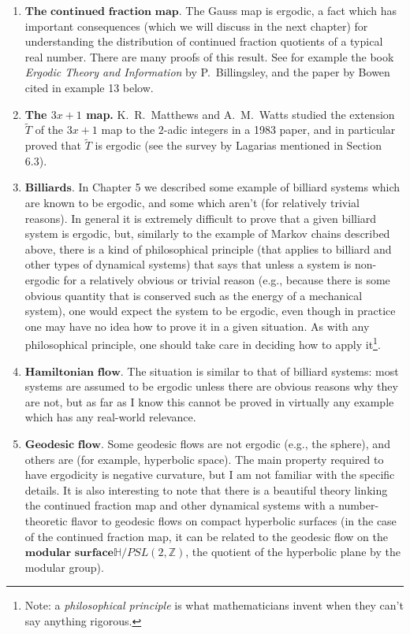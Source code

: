 \documentclass[11pt]{report}
\theoremstyle{plain}
\theoremstyle{definition}
\begin{document}
\begin{enumerate}[label=\arabic*.]
\item $\textbf{The continued fraction map.}$ The Gauss map
is ergodic, a fact which has important consequences
(which we will discuss in the next chapter) for
understanding the distribution of continued fraction
quotients of a typical real number. There are many
proofs of this result. See for example the book
\emph{Ergodic Theory and Information} by P.\ Billingsley,
and the paper by Bowen cited in example 13 below.

\item \textbf{The $3x+1$ map.} K.\ R.\ Matthews and A.\ M.\ Watts
studied the extension $\tilde{T}$ of the $3x+1$ map
to the $2$-adic integers in a 1983 paper, and in
particular proved that $\tilde{T}$ is ergodic (see
the survey by Lagarias mentioned in Section 6.3).

\item $\textbf{Billiards.}$ In Chapter 5 we described some
example of billiard systems which are known to be
ergodic, and some which aren't (for relatively trivial
reasons). In general it is extremely difficult to
prove that a given billiard system is ergodic, but,
similarly to the example of Markov chains described
above, there is a kind of philosophical principle
(that applies to billiard and other types of dynamical
systems) that says that unless a system is non-ergodic
for a relatively obvious or trivial reason (e.g.,
because there is some obvious quantity that is
conserved such as the energy of a mechanical system),
one would expect the system to be ergodic, even though
in practice one may have no idea how to prove it in a
given situation. As with any philosophical principle,
one should take care in deciding how to apply
it\footnote{Note: a \emph{philosophical principle} is what
mathematicians invent when they can't say anything
rigorous.}.

\item $\textbf{Hamiltonian flow.}$ The situation is similar
to that of billiard systems: most systems are assumed
to be ergodic unless there are obvious reasons why
they are not, but as far as I know this cannot be
proved in virtually any example which has any
real-world relevance.

\item $\textbf{Geodesic flow.}$ Some geodesic flows are not
ergodic (e.g., the sphere), and others are (for
example, hyperbolic space). The main property required
to have ergodicity is negative curvature, but I am not
familiar with the specific details. It is also
interesting to note that there is a beautiful theory
linking the continued fraction map and other dynamical
systems with a number-theoretic flavor to geodesic
flows on compact hyperbolic surfaces (in the case of
the continued fraction map, it can be related to the
geodesic flow on the $\textbf{modular surface}$$\mathbb{H}/PSL(2,\mathbb{Z})$, the quotient of the
hyperbolic plane by the modular group).


\end{enumerate}
\end{document}
